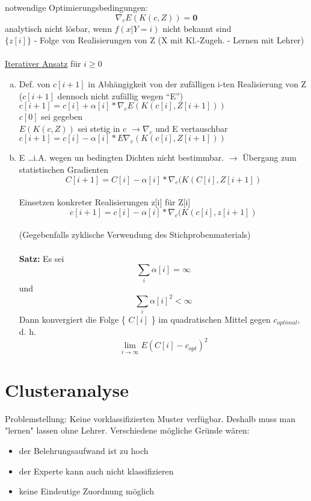 \documentclass[a4paper,12pt]{scrreprt}
\newcommand{\Nb}[1]{\textbf{#1}}
\begin{document}
  notwendige Optimierungsbedingungen:
  $$\nabla_c E(K(c,Z)) = \textbf{0}$$
  analytisch nicht lösbar, wenn $f(x|Y=i)$ nicht bekannt sind\\
  $\{z[i]\}$ - Folge von Realisierungen von Z (X mit Kl.-Zugeh. - Lernen mit Lehrer)\\
  \\
  \underline{Iterativer Ansatz} für $i\geq0$

\begin{enumerate}[a)]
  \item Def. von $c[i+1]$ in Abhängigkeit von der zufälligen i-ten Realisierung von Z\\
   ($c[i+1]$ dennoch nicht zufällig wegen "`E"')\\
   $c[i+1] = c[i] + \alpha[i] * \nabla_c E (K(c[i],Z[i+1]))$\\
   $c[0]$ sei gegeben\\
   $E(K(c,Z))$ sei stetig in c $\rightarrow\nabla_c$ und E vertauschbar\\
   $c[i+1] = c[i] - \alpha[i] * E\nabla_c(K(c[i],Z[i+1]))$ 
 \item E \dots i.A. wegen un bedingten Dichten nicht bestimmbar. $\rightarrow$ Übergang zum statistischen Gradienten\\
 $$C[i+1] = C[i] - \alpha[i] * \nabla_c (K(C[i],Z[i+1])$$\\
 Einsetzen konkreter Realisierungen z[i] für Z[i]\\
  $$c[i+1] = c[i] - \alpha[i] * \nabla_c (K(c[i],z[i+1])$$\\
  (Gegebenfalls zyklische Verwendung des Stichprobenmaterials)\\
  \\
  \Nb{Satz:} Es sei $$\sum_i \alpha[i] = \infty$$
  und $$ \sum_i \alpha[i]^2 < \infty $$
  Dann konvergiert die Folge \{ $C[i]$ \} im quadratischen Mittel gegen $c_{optimal}$, d. h. 
  $$ \lim \limits_{ i \to \infty} E(C[i]- c_{opt} )^2$$
\end{enumerate}

\section{Clusteranalyse}
Problemstellung: 
Keine vorklassifizierten Muster verfügbar. Deshalb
muss man "lernen" lassen ohne Lehrer. Verschiedene mögliche Gründe
wären:
\begin{itemize}
\item der Belehrungsaufwand ist zu hoch
\item der Experte kann auch nicht klassifizieren
\item keine Eindeutige Zuordnung möglich
\end{itemize}
\end{document}

